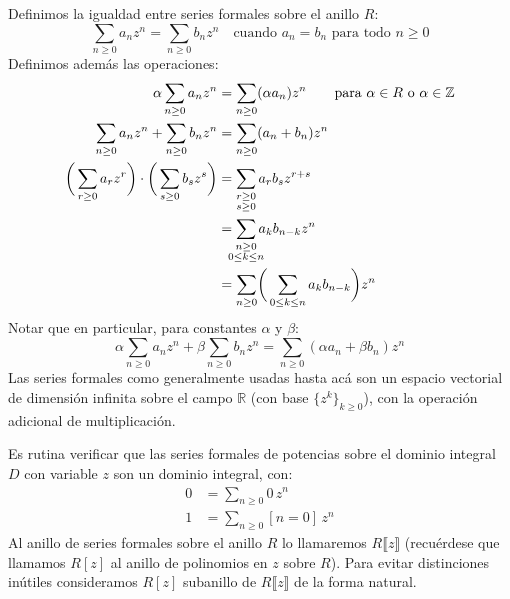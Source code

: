   Definimos la igualdad entre series formales sobre el anillo \(R\):%
  \begin{equation*}
    \sum_{n \ge 0} a_n z^n
       = \sum_{n \ge 0} b_n z^n \quad
	     \text{cuando \(a_n = b_n\) para todo \(n \ge 0\)}
  \end{equation*}
  Definimos además las operaciones:%
  \begin{align*}
    \alpha \sum_{n \ge 0} a_n z^n
       &= \sum_{n \ge 0} (\alpha a_n) z^n
	    \qquad \text{para \(\alpha \in R\) o \(\alpha \in \mathbb{Z}\)} \\
    \sum_{n \ge 0} a_n z^n + \sum_{n \ge 0} b_n z^n
       &= \sum_{n \ge 0} (a_n + b_n) z^n \\
    \biggl( \, \sum_{r \ge 0} a_r z^r \biggr) \cdot
      \biggl( \, \sum_{s \ge 0} b_s z^s \biggr)
       &= \sum_{\substack{
		  r \ge 0 \\
		  s \ge 0
	       }} a_r b_s z^{r + s} \\
       &= \sum_{\mathclap{\substack{
			    n \ge 0 \\
			    0 \le k \le n
	       }}} a_k b_{n - k} z^n \\
       &= \sum_{n \ge 0} \biggl( \,
			    \sum_{0 \le k \le n} a_k b_{n - k}
			  \biggr) z^n
  \end{align*}
  Notar que en particular,
  para constantes \(\alpha\) y \(\beta\):
  \begin{equation*}
    \alpha \sum_{n \ge 0} a_n z^n + \beta \sum_{n \ge 0} b_n z^n
      = \sum_{n \ge 0} (\alpha a_n + \beta b_n) z^n
  \end{equation*}
  Las series formales como generalmente usadas hasta acá
  son un espacio vectorial de dimensión infinita%
  sobre el campo \(\mathbb{R}\)
  (con base \(\{z^k\}_{k \ge 0}\)),
  con la operación adicional de multiplicación.

  Es rutina verificar que las series formales de potencias
  sobre el dominio integral \(D\) con variable \(z\)
  son un dominio integral,
  con:
  \begin{align*}
    0 &= \sum_{n \ge 0} 0 \, z^n \\
    1 &= \sum_{n \ge 0} [n = 0] \, z^n
  \end{align*}
  Al anillo de series formales sobre el anillo \(R\)
  lo llamaremos \(R \llbracket z \rrbracket\)
  (recuérdese que llamamos \(R[z]\)
   al anillo de polinomios en \(z\) sobre \(R\)).
  Para evitar distinciones inútiles
  consideramos \(R[z]\)
  subanillo de \(R\llbracket z \rrbracket\) de la forma natural.


